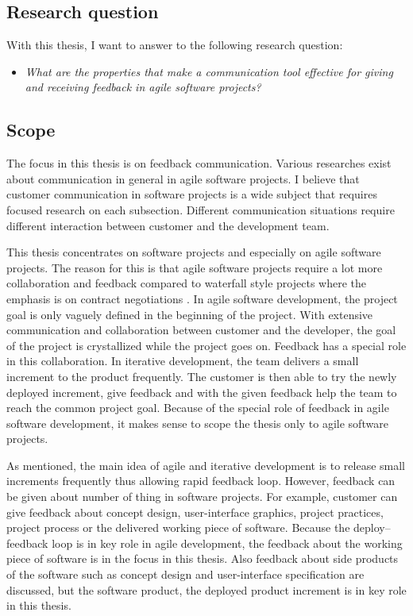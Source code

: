 \documentclass[english,12pt,a4paper,pdftex]{article}
\begin{document}
\subsection{Research question}
\label{sec:research_question}

With this thesis, I want to answer to the following research question:

\begin{itemize}
\item \textit{What are the properties that make a communication tool effective for giving and receiving feedback in agile software projects?}
\end{itemize}

\subsection{Scope}

The focus in this thesis is on feedback communication. Various researches exist about communication in general in agile software projects. I believe that customer communication in software projects is a wide subject that requires focused research on each subsection. Different communication situations require different interaction between customer and the development team. 

This thesis concentrates on software projects and especially on agile software projects. The reason for this is that agile software projects require a lot more collaboration and feedback compared to waterfall style projects where the emphasis is on contract negotiations \citep{larman2004}. In agile software development, the project goal is only vaguely defined in the beginning of the project. With extensive communication and collaboration between customer and the developer, the goal of the project is crystallized while the project goes on. Feedback has a special role in this collaboration. In iterative development, the team delivers a small increment to the product frequently. The customer is then able to try the newly deployed increment, give feedback and with the given feedback help the team to reach the common project goal. Because of the special role of feedback in agile software development, it makes sense to scope the thesis only to agile software projects.

As mentioned, the main idea of agile and iterative development is to release small increments frequently thus allowing rapid feedback loop. However, feedback can be given about number of thing in software projects. For example, customer can give feedback about concept design, user-interface graphics, project practices, project process or the delivered working piece of software. Because the deploy--feedback loop is in key role in agile development, the feedback about the working piece of software is in the focus in this thesis. Also feedback about side products of the software such as concept design and user-interface specification are discussed, but the software product, the deployed product increment is in key role in this thesis.
\end{document}
